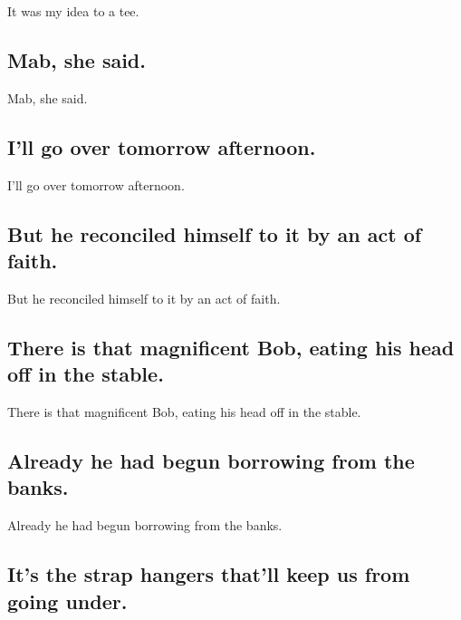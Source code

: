 \documentclass[]{article}
\begin{document}
It was my idea to a tee.

\hypertarget{mab-she-said.}{%
\subsection{Mab, she said.}\label{mab-she-said.}}

Mab, she said.

\hypertarget{ill-go-over-tomorrow-afternoon.}{%
\subsection{I'll go over tomorrow
afternoon.}\label{ill-go-over-tomorrow-afternoon.}}

I'll go over tomorrow afternoon.

\hypertarget{but-he-reconciled-himself-to-it-by-an-act-of-faith.}{%
\subsection{But he reconciled himself to it by an act of
faith.}\label{but-he-reconciled-himself-to-it-by-an-act-of-faith.}}

But he reconciled himself to it by an act of faith.

\hypertarget{there-is-that-magnificent-bob-eating-his-head-off-in-the-stable.}{%
\subsection{There is that magnificent Bob, eating his head off in the
stable.}\label{there-is-that-magnificent-bob-eating-his-head-off-in-the-stable.}}

There is that magnificent Bob, eating his head off in the stable.

\hypertarget{already-he-had-begun-borrowing-from-the-banks.}{%
\subsection{Already he had begun borrowing from the
banks.}\label{already-he-had-begun-borrowing-from-the-banks.}}

Already he had begun borrowing from the banks.

\hypertarget{its-the-strap-hangers-thatll-keep-us-from-going-under.}{%
\subsection{It's the strap hangers that'll keep us from going
under.}\label{its-the-strap-hangers-thatll-keep-us-from-going-under.}}
\end{document}
